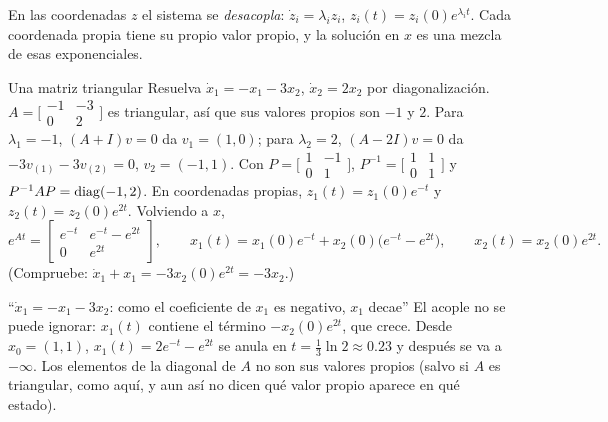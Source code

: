 En las coordenadas $z$ el sistema se \emph{desacopla}: $\dot z_i=\lambda_iz_i$, $z_i(t)=z_i(0)e^{\lambda_it}$. Cada coordenada propia tiene su propio valor propio, y la solución en $x$ es una mezcla de esas exponenciales.

\begin{ejemplo}[label=ej:bi-diagonal]{Una matriz triangular}
Resuelva $\dot x_1=-x_1-3x_2$, $\dot x_2=2x_2$ por diagonalización.
\solucion $A=\bigl[\begin{smallmatrix}-1&-3\\0&2\end{smallmatrix}\bigr]$ es triangular, así que sus valores propios son $-1$ y $2$. Para $\lambda_1=-1$, $(A+I)v=0$ da $v_1=(1,0)$; para $\lambda_2=2$, $(A-2I)v=0$ da $-3v_{(1)}-3v_{(2)}=0$, $v_2=(-1,1)$. Con $P=\bigl[\begin{smallmatrix}1&-1\\0&1\end{smallmatrix}\bigr]$, $P^{-1}=\bigl[\begin{smallmatrix}1&1\\0&1\end{smallmatrix}\bigr]$ y $P^{-1}AP=\operatorname{diag}(-1,2)$. En coordenadas propias, $z_1(t)=z_1(0)e^{-t}$ y $z_2(t)=z_2(0)e^{2t}$. Volviendo a $x$,
\[
  e^{At}=\begin{bmatrix}e^{-t}&e^{-t}-e^{2t}\\0&e^{2t}\end{bmatrix},\qquad
  x_1(t)=x_1(0)e^{-t}+x_2(0)\bigl(e^{-t}-e^{2t}\bigr),\qquad x_2(t)=x_2(0)e^{2t}.
\]
(Compruebe: $\dot x_1+x_1=-3x_2(0)e^{2t}=-3x_2$.)
\end{ejemplo}


\begin{trampa}[label=tr:bi-diagonal]{``$\dot x_1=-x_1-3x_2$: como el coeficiente de $x_1$ es negativo, $x_1$ decae''}
El acople no se puede ignorar: $x_1(t)$ contiene el término $-x_2(0)e^{2t}$, que crece. Desde $x_0=(1,1)$, $x_1(t)=2e^{-t}-e^{2t}$ se anula en $t=\tfrac13\ln2\approx0.23$ y después se va a $-\infty$. Los elementos de la diagonal de $A$ no son sus valores propios (salvo si $A$ es triangular, como aquí, y aun así no dicen qué valor propio aparece en qué estado).
\end{trampa}

